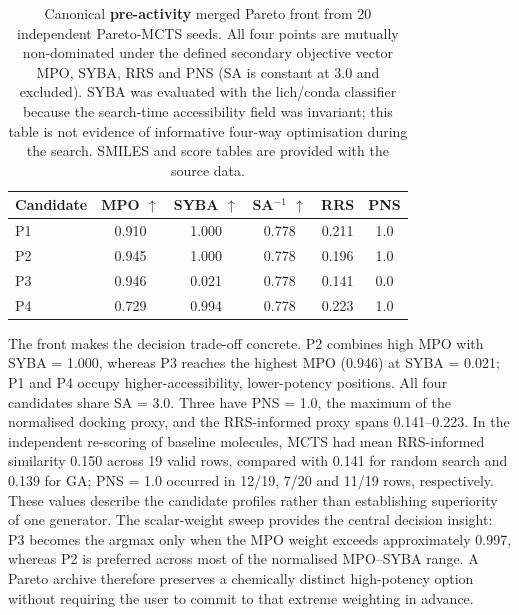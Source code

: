 \documentclass[10pt,a4paper]{article}
\begin{document}
\begin{table}[htbp]
  \centering
  \caption{Canonical \textbf{pre-activity} merged Pareto front from \num{20} independent Pareto-MCTS seeds. All four points are mutually non-dominated under the defined secondary objective vector MPO, SYBA, RRS and PNS (SA is constant at \num{3.0} and excluded). SYBA was evaluated with the lich/conda classifier because the search-time accessibility field was invariant; this table is not evidence of informative four-way optimisation during the search. SMILES and score tables are provided with the source data.}
  \label{tab:pareto}
  \begin{tabular}{lccccc}
    \toprule
    Candidate & MPO $\uparrow$ & SYBA $\uparrow$ & SA$^{-1}$ $\uparrow$ & RRS & PNS \\
    \midrule
    P1 & \num{0.910} & \num{1.000} & \num{0.778} & \num{0.211} & \num{1.0} \\
    P2 & \num{0.945} & \num{1.000} & \num{0.778} & \num{0.196} & \num{1.0} \\
    P3 & \num{0.946} & \num{0.021} & \num{0.778} & \num{0.141} & \num{0.0} \\
    P4 & \num{0.729} & \num{0.994} & \num{0.778} & \num{0.223} & \num{1.0} \\
    \bottomrule
  \end{tabular}
\end{table}

The front makes the decision trade-off concrete. P2 combines high MPO with SYBA = \num{1.000}, whereas P3 reaches the highest MPO (\num{0.946}) at SYBA = \num{0.021}; P1 and P4 occupy higher-accessibility, lower-potency positions. All four candidates share SA = \num{3.0}. Three have PNS = \num{1.0}, the maximum of the normalised docking proxy, and the RRS-informed proxy spans \num{0.141}--\num{0.223}. In the independent re-scoring of baseline molecules, MCTS had mean RRS-informed similarity \num{0.150} across \num{19} valid rows, compared with \num{0.141} for random search and \num{0.139} for GA; PNS = \num{1.0} occurred in \num{12}/\num{19}, \num{7}/\num{20} and \num{11}/\num{19} rows, respectively. These values describe the candidate profiles rather than establishing superiority of one generator. The scalar-weight sweep provides the central decision insight: P3 becomes the argmax only when the MPO weight exceeds approximately \num{0.997}, whereas P2 is preferred across most of the normalised MPO--SYBA range. A Pareto archive therefore preserves a chemically distinct high-potency option without requiring the user to commit to that extreme weighting in advance.
\end{document}
